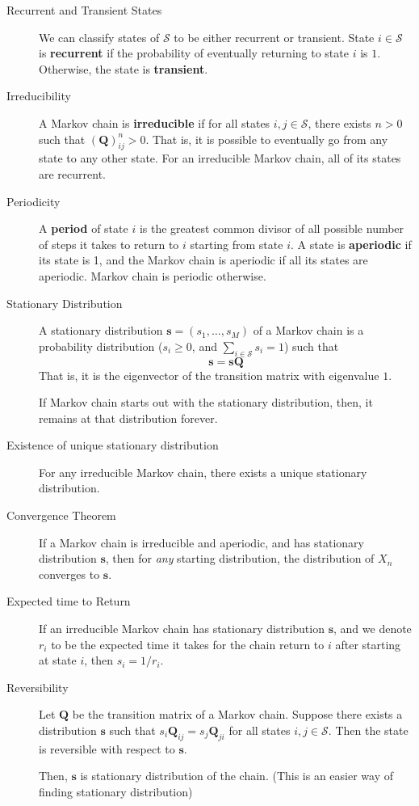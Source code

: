 \documentclass[11pt]{article}
\theoremstyle{definition}
\theoremstyle{remark}
\begin{document}
\begin{description}
    \item[Recurrent and Transient States] We can classify states of $\mathcal{S}$ to be either recurrent or transient. State $i \in \mathcal{S}$ is \textbf{recurrent} if the probability of eventually returning to state $i$ is $1$. Otherwise, the state is \textbf{transient}.
    
    \item[Irreducibility] A Markov chain is \textbf{irreducible} if for all states $i,j \in \mathcal{S}$, there exists $n > 0$ such that $(\bm{Q})^n_{ij} > 0$. That is, it is possible to eventually go from any state to any other state. For an irreducible Markov chain, all of its states are recurrent.
    
    \item[Periodicity] A \textbf{period} of state $i$ is the greatest common divisor of all possible number of steps it takes to return to $i$ starting from state $i$. A state is \textbf{aperiodic} if its state is 1, and the Markov chain is aperiodic if all its states are aperiodic. Markov chain is periodic otherwise.
    
    \item[Stationary Distribution] A stationary distribution $\bm{s} = (s_1, \ldots, s_M)$ of a Markov chain is a probability distribution ($s_i \geq 0$, and $\sum_{i \in \mathcal{S}} s_i = 1$) such that $$ \bm{s} = \bm{s} \bm{Q} $$ That is, it is the eigenvector of the transition matrix with eigenvalue $1$. 
    
    If Markov chain starts out with the stationary distribution, then, it remains at that distribution forever.
    
    \item[Existence of unique stationary distribution] For any irreducible Markov chain, there exists a unique stationary distribution. 
    
    \item[Convergence Theorem] If a Markov chain is irreducible and aperiodic, and has stationary distribution $\bm{s}$, then for \textit{any} starting distribution, the distribution of $X_n$ converges to $\bm{s}$. 
    
    \item[Expected time to Return] If an irreducible Markov chain has stationary distribution $\bm{s}$, and we denote $r_i$ to be the expected time it takes for the chain return to $i$ after starting at state $i$, then $s_i = 1/r_i$.
    
    \item[Reversibility] Let $\bm{Q}$ be the transition matrix of a Markov chain. Suppose there exists a distribution $\bm{s}$ such that $s_i \bm{Q}_{ij} = s_j \bm{Q}_{ji}$ for all states $i,j \in \mathcal{S}$. Then the state is reversible with respect to $\bm{s}$.
    
    Then, $\bm{s}$ is stationary distribution of the chain. (This is an easier way of finding stationary distribution)
    
\end{description}
\end{document}

